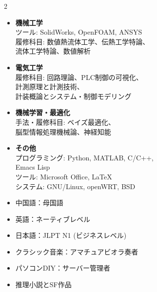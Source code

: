 \documentclass[10pt,a4paper]{article}
\begin{document}
\vspace{1pt}
\setlength{\columnsep}{2\dimexpr\columnsep\relax}
\begin{multicols}{2}
\begin{itemize}[itemsep=5pt,topsep=2pt]
  \item \textbf{機械工学}\\
        ツール: SolidWorks, OpenFOAM, ANSYS\\
        履修科目: 数値熱流体工学、伝熱工学特論、\\
        流体工学特論、数値解析
  \item \textbf{電気工学}\\
        履修科目: 回路理論、PLC制御の可視化、\\
        計測原理と計測技術、\\
        計装概論とシステム・制御モデリング
  \item \textbf{機械学習・最適化}\\
        手法・履修科目: ベイズ最適化、\\
        脳型情報処理機械論、神経知能
  \item \textbf{その他}\\
        プログラミング: Python, MATLAB, C/C++,\\
        Emacs Lisp\\
        ツール: Microsoft Office, \LaTeX\\
        システム: GNU/Linux, openWRT, BSD
\end{itemize}

\columnbreak
{}
\begin{itemize}
  \item 中国語：母国語
  \item 英語：ネーティブレベル
  \item 日本語：JLPT N1 (ビジネスレベル)
\end{itemize}

\begin{itemize}[itemsep=4pt,topsep=2pt]
  \item クラシック音楽：アマチュアビオラ奏者
  \item パソコンDIY：サーバー管理者
  \item 推理小説とSF作品
\end{itemize}
\end{multicols}
\end{document}
